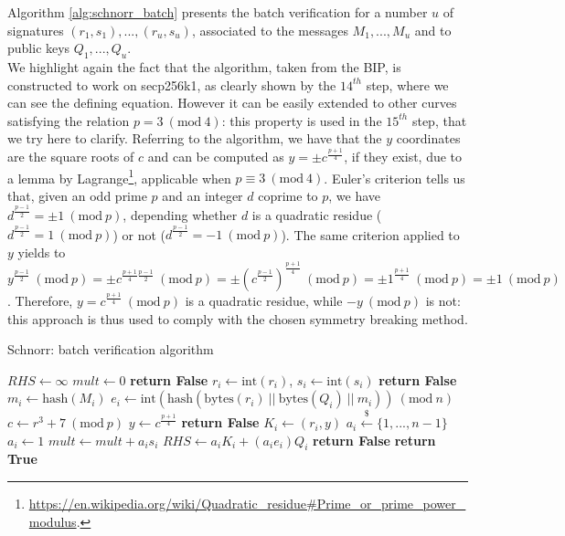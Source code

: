 \bigskip
\noindent
Algorithm \ref{alg:schnorr_batch} presents the batch verification for a number $u$ of signatures $(r_1, s_1), ..., (r_u, s_u)$, associated to the messages $M_1, ..., M_u$ and to public keys $Q_1, ..., Q_u$.
\\
We highlight again the fact that the algorithm, taken from the BIP, is constructed to work on secp256k1, as clearly shown by the $14^{th}$ step, where we can see the defining equation. However it can be easily extended to other curves satisfying the relation $p = 3 \ (\text{mod} \ 4)$: this property is used in the $15^{th}$ step, that we try here to clarify. Referring to the algorithm, we have that the $y$ coordinates are the square roots of $c$ and can be computed as $y = \pm c^{\frac{p + 1}{4}}$, if they exist, due to a lemma by Lagrange\footnote{\url{https://en.wikipedia.org/wiki/Quadratic\_residue\#Prime\_or\_prime\_power\_modulus}.}, applicable when $p \equiv 3 \ (\text{mod} \ 4)$. Euler's criterion tells us that, given an odd prime $p$ and an integer $d$ coprime to $p$, we have $d^{\frac{p - 1}{2}} = \pm 1 \ (\text{mod} \ p)$, depending whether $d$ is a quadratic residue ($d^{\frac{p - 1}{2}} = 1 \ (\text{mod} \ p)$) or not ($d^{\frac{p - 1}{2}} = - 1 \ (\text{mod} \ p)$). The same criterion applied to $y$ yields to $y^{\frac{p - 1}{2}} \ (\text{mod} \ p) = \pm c^{\frac{p + 1}{4}\frac{p - 1}{2}} \ (\text{mod} \ p) = \pm (c^{\frac{p - 1}{2}})^{\frac{p + 1}{4}} \ (\text{mod} \ p) = \pm 1^{\frac{p + 1}{4}} \ (\text{mod} \ p) = \pm 1 \ (\text{mod} \ p)$. Therefore, $y = c^{\frac{p + 1}{4}} \ (\text{mod} \ p)$ is a quadratic residue, while $-y \ (\text{mod} \ p)$ is not: this approach is thus used to comply with the chosen symmetry breaking method.

\begin{algorithm}
	\caption{Schnorr: batch verification algorithm}
	\label{alg:schnorr_batch}
	\begin{algorithmic}[1]
		\State $RHS \gets \infty$
		\State $mult \gets 0$
		\State \textbf{return False}
		\EndIf
		\State $r_i \gets \text{int}(r_i)$, $s_i \gets \text{int}(s_i)$
		\State \textbf{return False}
		\EndIf
		\State $m_i \gets \text{hash}(M_i)$
		\State $e_i \gets \text{int}(\text{hash}(\text{bytes}(r_i) \ || \ \text{bytes}(Q_i) \ || \ m_i)) \ (\text{mod} \ n)$
		\State $c \gets r^3 + 7 \ (\text{mod} \ p)$
		\State $y \gets c^{\frac{p + 1}{4}}$
		\State \textbf{return False}
		\EndIf
		\State $K_i \gets (r_i, y)$
		\State  $a_i \xleftarrow{\text{\$}} \{1, ..., n - 1\}$ 
		\Else
		\State $a_i \gets 1$
		\EndIf
		\State $mult \gets mult + a_is_i$
		\State $RHS \gets a_iK_i + (a_ie_i)Q_i$
		\EndFor
		\State \textbf{return False}
		\EndIf
		\State \textbf{return True}
		\EndProcedure	
	\end{algorithmic}
\end{algorithm}